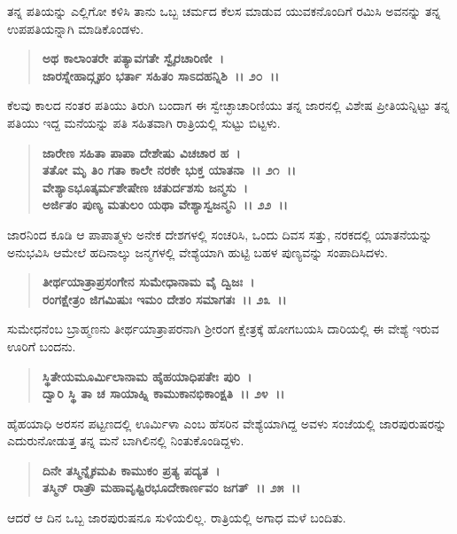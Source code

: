 ತನ್ನ ಪತಿಯನ್ನು ಎಲ್ಲಿಗೋ ಕಳಿಸಿ ತಾನು ಒಬ್ಬ ಚರ್ಮದ ಕೆಲಸ ಮಾಡುವ ಯುವಕ\-ನೊಂದಿಗೆ ರಮಿಸಿ ಅವನನ್ನು ತನ್ನ ಉಪಪತಿಯನ್ನಾಗಿ ಮಾಡಿಕೊಂಡಳು.

\begin{verse}
\textbf{ಅಥ ಕಾಲಾಂತರೇ ಪತ್ಯಾವಗತೇ ಸ್ವೈರಚಾರಿಣೀ~।}\\\textbf{ಜಾರಸ್ನೇಹಾದ್ಗೃಹಂ ಭರ್ತಾ ಸಹಿತಂ ಸಾಽದಹನ್ನಿಶಿ~।। ೨೦~।।}
\end{verse}

ಕೆಲವು ಕಾಲದ ನಂತರ ಪತಿಯು ತಿರುಗಿ ಬಂದಾಗ ಈ ಸ್ವೇಚ್ಛಾಚಾರಿಣಿಯು ತನ್ನ ಜಾರನಲ್ಲಿ ವಿಶೇಷ ಪ್ರೀತಿಯನ್ನಿಟ್ಟು ತನ್ನ ಪತಿಯು ಇದ್ದ ಮನೆಯನ್ನು ಪತಿ ಸಹಿತವಾಗಿ ರಾತ್ರಿಯಲ್ಲಿ ಸುಟ್ಟು ಬಿಟ್ಟಳು.

\begin{verse}
\textbf{ಜಾರೇಣ ಸಹಿತಾ ಪಾಪಾ ದೇಶೇಷು ವಿಚಚಾರ ಹ~।}\\\textbf{ತತೋ ಮೃ ತಿಂ ಗತಾ ಕಾಲೇ ನರಕೇ ಭುಕ್ತ ಯಾತನಾ~।। ೨೧~।। }\\\textbf{ವೇಶ್ಯಾಽಭೂತ್ಕರ್ಮಶೇಷೇಣ ಚತುರ್ದಶಸು ಜನ್ಮಸು~।} \\\textbf{ಅರ್ಜಿತಂ ಪುಣ್ಯ ಮತುಲಂ ಯಥಾ ವೇಶ್ಯಾಸ್ವಜನ್ಮನಿ~।। ೨೨~।।}
\end{verse}

ಜಾರನಿಂದ ಕೂಡಿ ಆ ಪಾಪಾತ್ಮಳು ಅನೇಕ ದೇಶಗಳಲ್ಲಿ ಸಂಚರಿಸಿ, ಒಂದು ದಿವಸ ಸತ್ತು, ನರಕದಲ್ಲಿ ಯಾತನೆಯನ್ನು ಅನುಭವಿಸಿ ಆಮೇಲೆ ಹದಿನಾಲ್ಕು ಜನ್ಮಗಳಲ್ಲಿ ವೇಶ್ಯೆಯಾಗಿ ಹುಟ್ಟಿ ಬಹಳ ಪುಣ್ಯವನ್ನು ಸಂಪಾದಿಸಿದಳು.

\begin{verse}
\textbf{ತೀರ್ಥಯಾತ್ರಾಪ್ರಸಂಗೇನ ಸುಮೇಧಾನಾಮ ವೈ ದ್ವಿಜಃ~।}\\\textbf{ರಂಗಕ್ಷೇತ್ರಂ ಜಿಗಮಿಷುಃ ಇಮಂ ದೇಶಂ ಸಮಾಗತಃ~।। ೨೩~।।}
\end{verse}

ಸುಮೇಧನೆಂಬ ಬ್ರಾಹ್ಮಣನು ತೀರ್ಥಯಾತ್ರಾಪರನಾಗಿ ಶ‍್ರೀರಂಗ ಕ್ಷೇತ್ರಕ್ಕೆ ಹೋಗಬಯಸಿ ದಾರಿಯಲ್ಲಿ ಈ ವೇಶ್ಯೆ ಇರುವ ಊರಿಗೆ ಬಂದನು.

\begin{verse}
\textbf{ಸ್ಥಿತೇಯಮೂರ್ಮಿಲಾನಾಮ ಹೈಹಯಾಧಿಪತೇಃ ಪುರಿ~।}\\\textbf{ದ್ವಾರಿ ಸ್ಥಿ ತಾ ಚ ಸಾಯಾಹ್ನಿ ಕಾಮುಕಾನಭಿಕಾಂಕ್ಷತಿ~।। ೨೪~।।}
\end{verse}

ಹೈಹಯಾಧಿ ಅರಸನ ಪಟ್ಟಣದಲ್ಲಿ ಊರ್ಮಿಳಾ ಎಂಬ ಹೆಸರಿನ ವೇಶ್ಯೆಯಾಗಿದ್ದ ಅವಳು ಸಂಜೆಯಲ್ಲಿ ಜಾರಪುರುಷರನ್ನು ಎದುರುನೋಡುತ್ತ ತನ್ನ ಮನೆ ಬಾಗಿಲಿನಲ್ಲಿ ನಿಂತುಕೊಂಡಿದ್ದಳು.

\begin{verse}
\textbf{ದಿನೇ ತಸ್ಮಿನ್ನೈಕಮಪಿ ಕಾಮುಕಂ ಪ್ರತ್ಯ ಪದ್ಯತ~।}\\\textbf{ತಸ್ಮಿನ್ ರಾತ್ರೌ ಮಹಾವೃಷ್ಟಿರಭೂದೇಕಾರ್ಣವಂ ಜಗತ್~।। ೨೫~।।}
\end{verse}

ಆದರೆ ಆ ದಿನ ಒಬ್ಬ ಜಾರಪುರುಷನೂ ಸುಳಿಯಲಿಲ್ಲ. ರಾತ್ರಿಯಲ್ಲಿ ಅಗಾಧ ಮಳೆ ಬಂದಿತು.

